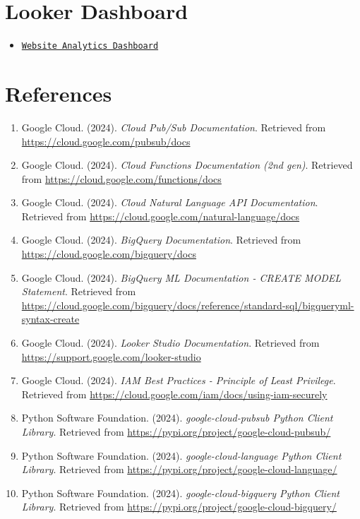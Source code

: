 \documentclass[12pt,a4paper]{article}
\begin{document}
\section{Looker Dashboard}

\begin{itemize}
    \item \texttt{\href{https://lookerstudio.google.com/reporting/8d204672-275a-4632-b700-d4075e46667b}{Website Analytics Dashboard}}
\end{itemize}

\section{References}

\begin{enumerate}
    \item Google Cloud. (2024). \textit{Cloud Pub/Sub Documentation}. Retrieved from \url{https://cloud.google.com/pubsub/docs}
    
    \item Google Cloud. (2024). \textit{Cloud Functions Documentation (2nd gen)}. Retrieved from \url{https://cloud.google.com/functions/docs}
    
    \item Google Cloud. (2024). \textit{Cloud Natural Language API Documentation}. Retrieved from \url{https://cloud.google.com/natural-language/docs}
    
    \item Google Cloud. (2024). \textit{BigQuery Documentation}. Retrieved from \url{https://cloud.google.com/bigquery/docs}
    
    \item Google Cloud. (2024). \textit{BigQuery ML Documentation - CREATE MODEL Statement}. Retrieved from \url{https://cloud.google.com/bigquery/docs/reference/standard-sql/bigqueryml-syntax-create}
    
    \item Google Cloud. (2024). \textit{Looker Studio Documentation}. Retrieved from \url{https://support.google.com/looker-studio}
    
    \item Google Cloud. (2024). \textit{IAM Best Practices - Principle of Least Privilege}. Retrieved from \url{https://cloud.google.com/iam/docs/using-iam-securely}
    
    \item Python Software Foundation. (2024). \textit{google-cloud-pubsub Python Client Library}. Retrieved from \url{https://pypi.org/project/google-cloud-pubsub/}
    
    \item Python Software Foundation. (2024). \textit{google-cloud-language Python Client Library}. Retrieved from \url{https://pypi.org/project/google-cloud-language/}
    
    \item Python Software Foundation. (2024). \textit{google-cloud-bigquery Python Client Library}. Retrieved from \url{https://pypi.org/project/google-cloud-bigquery/}
\end{enumerate}
\end{document}
